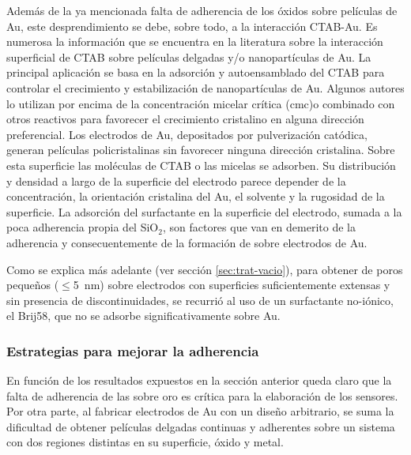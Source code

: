 			Además de la ya mencionada falta de adherencia de los óxidos sobre películas de Au, este desprendimiento se debe, sobre todo, a la interacción CTAB-Au. Es numerosa la información que se encuentra en la literatura sobre la interacción superficial de CTAB sobre películas delgadas y/o nanopartículas de Au. La principal aplicación se basa en la adsorción y autoensamblado del CTAB para controlar el crecimiento y estabilización de nanopartículas de Au. \cite{Cheng2003,Smith2008,Meena2013,Wang2013,Hamon2009} Algunos autores lo utilizan por encima de la concentración micelar crítica (cmc)\cite{Lim2014}o combinado con otros reactivos para favorecer el crecimiento cristalino en alguna dirección preferencial\cite{Smith2009}. Los electrodos de Au, depositados por pulverización catódica, generan películas policristalinas sin favorecer ninguna dirección cristalina.\cite{Svorcik2010,Bechelany2010} Sobre esta superficie las moléculas de CTAB o las micelas se adsorben. Su distribución y densidad a largo de la superficie del electrodo parece depender de la concentración, la orientación cristalina del Au, el solvente y la rugosidad de la superficie\cite{Meena2013,Lim2014}. La adsorción del surfactante en la superficie del electrodo, sumada a la poca adherencia propia del SiO$_2$\cite{Kern1990,Hieber1976}, son factores que van en demerito de la adherencia y consecuentemente de la formación de \pdmC\space sobre electrodos de Au. 
			
			Como se explica más adelante (ver sección \ref{sec:trat-vacio}), para obtener \pdm\space de poros pequeños ($\leq$\SI{5}{\nm}) sobre electrodos con superficies suficientemente extensas y sin presencia de discontinuidades, se recurrió al uso de un surfactante no-iónico, el Brij58, que no se adsorbe significativamente sobre Au.
							
		\subsubsection{Estrategias para mejorar la adherencia}\label{sec:adherencia}

			 En función de los resultados expuestos en la sección anterior queda claro que la falta de adherencia de las \pdm\space sobre oro es crítica para la elaboración de los sensores. Por otra parte, al fabricar electrodos de Au con un diseño arbitrario, se suma la dificultad de obtener películas delgadas continuas y adherentes sobre un sistema con dos regiones distintas en su superficie, óxido y metal.
 			
